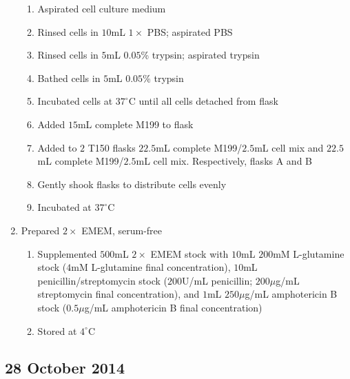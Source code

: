\begin{enumerate}
		\begin{enumerate}
			\item Aspirated cell culture medium
			\item Rinsed cells in $10$mL $1\times$ PBS; aspirated PBS
			\item Rinsed cells in $5$mL $0.05$\% trypsin; aspirated trypsin
			\item Bathed cells in $5$mL $0.05$\% trypsin
			\item Incubated cells at $37^{\circ}$C until all cells detached from flask
			\item Added $15$mL complete M199 to flask
			\item Added to $2$ T150 flasks $22.5$mL complete M199/$2.5$mL cell mix and $22.5$mL complete M199/$2.5$mL cell mix. Respectively, flasks A and B
			\item Gently shook flasks to distribute cells evenly
			\item Incubated at $37^{\circ}$C
		\end{enumerate}
	\item Prepared $2\times$ EMEM, serum-free
		\begin{enumerate}
			\item Supplemented $500$mL $2\times$ EMEM stock with $10$mL $200$mM L-glutamine stock ($4$mM L-glutamine final concentration), $10$mL penicillin/streptomycin stock ($200$U/mL penicillin; $200\mu$g/mL streptomycin final concentration), and $1$mL $250\mu$g/mL amphotericin B stock ($0.5\mu$g/mL amphotericin B final concentration)
			\item Stored at $4^{\circ}$C
		\end{enumerate}
\end{enumerate}

\subsection*{28 October 2014}

